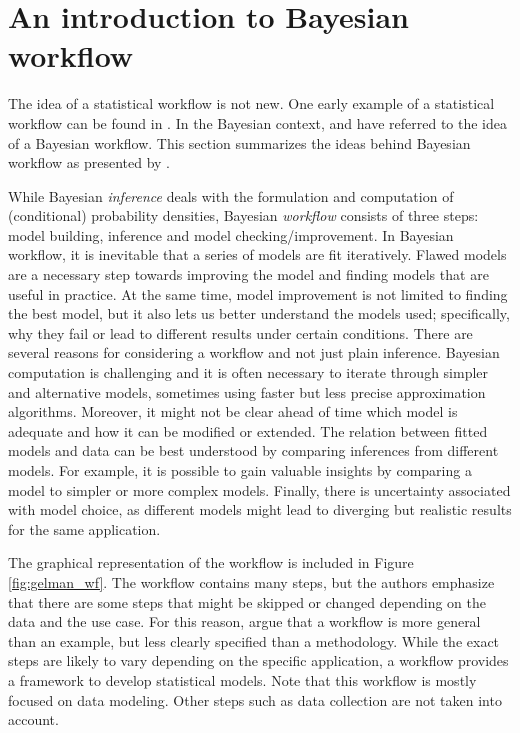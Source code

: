\section{An introduction to Bayesian workflow}

The idea of a statistical workflow is not new.
One early example of a statistical workflow can be found in \cite{box_science_1976}.
In the Bayesian context, \cite{gabry_visualization_2019} and \cite{betancourt_towards_2020} have referred to the idea of a Bayesian workflow.
This section summarizes the ideas behind Bayesian workflow as presented by \cite{gelman_bayesian_2020}.

While Bayesian \textit{inference} deals with the formulation and computation of (conditional) probability densities, Bayesian \textit{workflow} consists of three steps: model building, inference and model checking/improvement.
In Bayesian workflow, it is inevitable that a series of models are fit iteratively.
Flawed models are a necessary step towards improving the model and finding models that are useful in practice.
At the same time, model improvement is not limited to finding the best model, but it also lets us better understand the models used; specifically, why they fail or lead to different results under certain conditions.
There are several reasons for considering a workflow and not just plain inference.
Bayesian computation is challenging and it is often necessary to iterate through simpler and alternative models, sometimes using faster but less precise approximation algorithms.
Moreover, it might not be clear ahead of time which model is adequate and how it can be modified or extended.
The relation between fitted models and data can be best understood by comparing inferences from different models.
For example, it is possible to gain valuable insights by comparing a model to simpler or more complex models.
Finally, there is uncertainty associated with model choice, as different models might lead to diverging but realistic results for the same application.

The graphical representation of the workflow is included in Figure \ref{fig:gelman_wf}.
The workflow contains many steps, but the authors emphasize that there are some steps that might be skipped or changed depending on the data and the use case.
For this reason, \cite{gelman_bayesian_2020} argue that a workflow is more general than an example, but less clearly specified than a methodology.
While the exact steps are likely to vary depending on the specific application, a workflow provides a framework to develop statistical models.
Note that this workflow is mostly focused on data modeling.
Other steps such as data collection are not taken into account.

